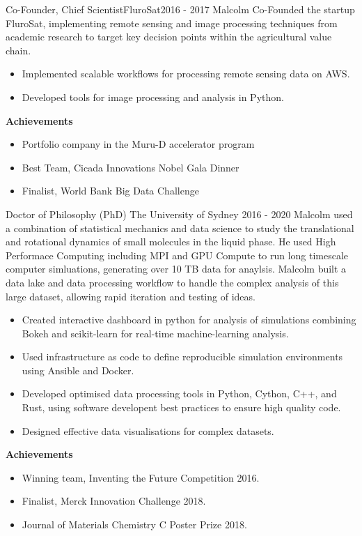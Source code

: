 \begin{cventry}{Co-Founder, Chief Scientist}{FluroSat}{}{2016 - 2017}
  Malcolm Co-Founded the startup FluroSat, 
  implementing remote sensing and image processing techniques 
  from academic research to target key decision points 
  within the agricultural value chain.
  \begin{itemize}
    \item Implemented scalable workflows for processing remote sensing data on AWS.
    \item Developed tools for image processing and analysis in Python.
    \end{itemize}
  \textbf{Achievements}
  \begin{itemize}
      \item Portfolio company in the Muru-D accelerator program
      \item Best Team, Cicada Innovations Nobel Gala Dinner
      \item Finalist, World Bank Big Data Challenge
  \end{itemize}
\end{cventry}



\begin{cventry}
  {Doctor of Philosophy (PhD)} %
  {The University of Sydney} %
  {} %
  {2016 - 2020} %
  Malcolm used a combination of statistical mechanics and data science to
  study the translational and rotational dynamics
  of small molecules in the liquid phase.
  He used High Performace Computing
  including MPI and GPU Compute
  to run long timescale computer simluations,
  generating over 10 TB data for anaylsis.
  Malcolm built a data lake and data processing workflow
  to handle the complex analysis of this large dataset,
  allowing rapid iteration and testing of ideas.
  \begin{itemize}
    \item Created interactive dashboard in python for analysis of simulations
      combining Bokeh and scikit-learn for real-time machine-learning analysis.
    \item Used infrastructure as code to define reproducible simulation environments
      using Ansible and Docker.
    \item Developed optimised data processing tools in Python, Cython, C++, and Rust,
      using software developent best practices to ensure high quality code.
    \item Designed effective data visualisations for complex datasets.
  \end{itemize}
  \textbf{Achievements}
  \begin{itemize}
    \item Winning team, Inventing the Future Competition 2016.
    \item Finalist, Merck Innovation Challenge 2018.
    \item Journal of Materials Chemistry C Poster Prize 2018.
  \end{itemize}
\end{cventry}

